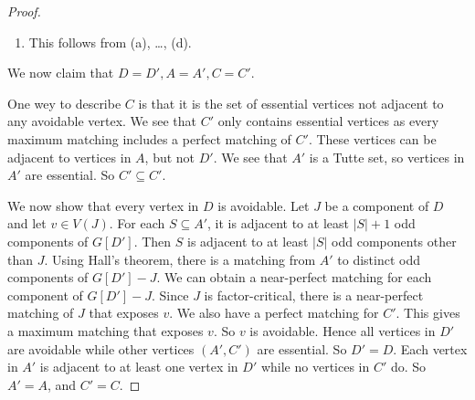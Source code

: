 \documentclass[co342]{subfiles}
\begin{document}
\begin{proof}
\begin{enumerate}
            \item This follows from (a), \ldots, (d).
        \end{enumerate}
        
        We now claim that $D=D', A=A', C=C'$. 

        One wey to describe $C$ is that it is the set of essential vertices not adjacent to any avoidable vertex. We see that $C'$ only contains essential vertices as every maximum matching includes a perfect matching of $C'$. These vertices can be adjacent to vertices in $A$, but not $D'$. We see that $A'$ is a Tutte set, so vertices in $A'$ are essential. So $C'\subseteq C'$. 

        We now show that every vertex in $D$ is avoidable. Let $J$ be a component of $D$ and let $v\in V\left( J \right)$. For each $S\subseteq A'$, it is adjacent to at least $\left| S \right|+1$ odd components of $G\left[ D' \right]$. Then $S$ is adjacent to at least $\left| S \right|$ odd components other than $J$. Using Hall's theorem, there is a matching from $A'$ to distinct odd components of $G\left[ D' \right]-J$. We can obtain a near-perfect matching for each component of $G\left[ D' \right]-J$. Since $J$ is factor-critical, there is a near-perfect matching of $J$ that exposes $v$. We also have a perfect matching for $C'$. This gives a maximum matching that exposes $v$. So $v$ is avoidable. Hence all vertices in $D'$ are avoidable while other vertices $\left( A',C' \right)$ are essential. So $D'=D$. Each vertex in $A'$ is adjacent to at least one vertex in $D'$ while no vertices in $C'$ do. So $A'=A$, and $C'=C$.
    \end{proof}
    
\end{document}
